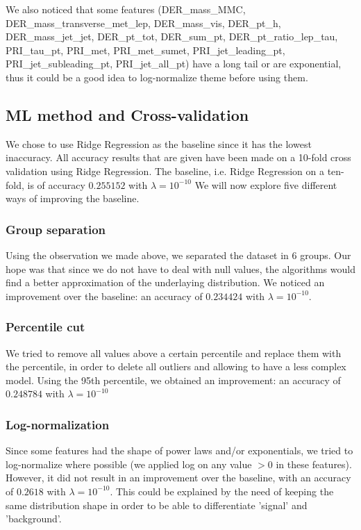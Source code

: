 \documentclass[10pt,conference,compsocconf]{IEEEtran}
\begin{document}
We also noticed that some features (DER\_mass\_MMC, DER\_mass\_transverse\_met\_lep, DER\_mass\_vis, DER\_pt\_h, DER\_mass\_jet\_jet, DER\_pt\_tot, DER\_sum\_pt, DER\_pt\_ratio\_lep\_tau, PRI\_tau\_pt, PRI\_met, PRI\_met\_sumet, PRI\_jet\_leading\_pt, PRI\_jet\_subleading\_pt, PRI\_jet\_all\_pt) have a long tail or are exponential, thus it could be a good
idea to log-normalize theme before using them.

\subsection{ML method and Cross-validation}
We chose to use Ridge Regression as the baseline since it has the lowest
inaccuracy.
All accuracy results that are given have been made on a 10-fold cross validation
using Ridge Regression. The baseline, i.e. Ridge Regression on a ten-fold, is
of accuracy $0.255152$ with $\lambda = 10^{-10}$
We will now explore five different ways of improving the baseline.

\subsubsection{Group separation}
Using the observation we made above, we separated the dataset in 6 groups. Our
hope was that since we do not have to deal with null values, the algorithms
would find a better approximation of the underlaying distribution. We noticed an
improvement over the baseline: an accuracy of $0.234424$ with $\lambda =
10^{-10}$.

\subsubsection{Percentile cut}
We tried to remove all values above a certain percentile and replace them with
the percentile, in order to delete all outliers and allowing to have a less
complex model. Using the 95th percentile, we obtained an improvement: an
accuracy of $0.248784$ with $\lambda = 10^{-10}$

\subsubsection{Log-normalization}
Since some features had the shape of power laws and/or exponentials, we tried to
log-normalize where possible (we applied log on any value $>0$ in these
features). However, it did not result in an improvement over the baseline, with
an accuracy of $0.2618$ with $\lambda = 10^{-10}$. This could be explained by
the need of keeping the same distribution shape in order to be able to
differentiate 'signal' and 'background'.
\end{document}
